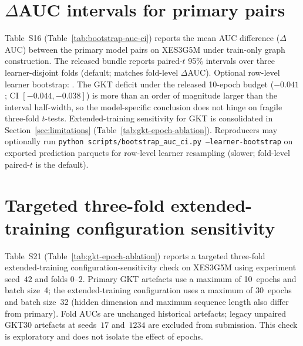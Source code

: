 \documentclass[pdflatex,sn-mathphys-num]{sn-jnl}
\begin{document}
\section{$\Delta$AUC intervals for primary pairs}
\label{sec:supp-bootstrap}
Table~S16 (Table~\ref{tab:bootstrap-auc-ci}) reports the mean AUC difference
($\Delta$AUC) between the primary model pairs on XES3G5M under train-only
graph construction. The released bundle reports paired-$t$ 95\% intervals
over three learner-disjoint folds (default; matches fold-level
$\Delta$AUC). Optional row-level learner bootstrap:
.
The GKT deficit under the released 10-epoch budget ($-0.041$; CI $[-0.044,-0.038]$) is more than an order of
magnitude larger than the interval half-width, so the model-specific conclusion
does not hinge on fragile three-fold $t$-tests. Extended-training sensitivity
for GKT is consolidated in Section~\ref{sec:limitations}
(Table~\ref{tab:gkt-epoch-ablation}). Reproducers may optionally run
\texttt{python scripts/bootstrap\_auc\_ci.py --learner-bootstrap} on exported
prediction parquets for row-level learner resampling (slower; fold-level
paired-$t$ is the default).
\begin{table}[h!]
\centering
\caption{$\Delta$AUC intervals for primary pairs, XES3G5M, train-only graphs (Table S16)}
\label{tab:bootstrap-auc-ci}

\end{table}

\section{Targeted three-fold extended-training configuration sensitivity}
\label{sec:supp-gkt-epoch}
Table~S21 (Table~\ref{tab:gkt-epoch-ablation}) reports a targeted three-fold
extended-training configuration-sensitivity check on XES3G5M using experiment
seed~$42$ and folds $0$--$2$. Primary GKT artefacts use a maximum of 10~epochs
and batch size~4; the extended-training configuration uses a maximum of
30~epochs and batch size~32 (hidden dimension and maximum sequence length also
differ from primary). Fold AUCs are unchanged historical artefacts;
legacy unpaired GKT30 artefacts at seeds~$17$ and~$1234$ are excluded from
submission. This check is exploratory and does not isolate the effect of epochs.
\begin{table}[h!]
\centering
\caption{Targeted three-fold extended-training configuration-sensitivity
check on XES3G5M using experiment seed~$42$. The primary GKT
configuration used a maximum of 10 epochs and batch size~4,
whereas the extended-training configuration used a maximum of
30 epochs and batch size~32. The observed mean AUC was $0.003451$
higher under the extended-training configuration; however, the
approximate 95\% confidence interval $[-0.004, 0.011]$ included zero.
Because maximum epochs, batch size, hidden dimension, and sequence length
all changed, this exploratory comparison does not isolate the effect of epochs.}
\label{tab:gkt-epoch-ablation}

\end{table}
\end{document}

